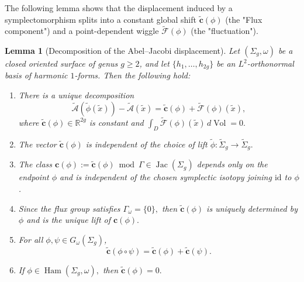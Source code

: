\documentclass[11pt]{article}
\newtheorem{lemma}[theorem]{Lemma}
\theoremstyle{definition}
\newcommand{\Ham}{\operatorname{Ham}}
\begin{document}
	
	
	
	The following lemma shows that the displacement induced by a symplectomorphism
	splits into a constant global shift $\widetilde{\mathbf c}(\phi)$ (the "Flux
	component") and a point-dependent wiggle $\widetilde{\mathcal F}(\phi)$ (the
	"fluctuation").
	
	\begin{lemma}[Decomposition of the Abel--Jacobi displacement]
		\label{lem:AJ_decomposition}
		Let $(\Sigma_g,\omega)$ be a closed oriented surface of genus $g\ge2$, and let
		$\{h_1,\ldots,h_{2g}\}$ be an $L^2$-orthonormal basis of harmonic $1$-forms.
		Then the following hold:
		
		\begin{enumerate}
			\item
			There is a unique decomposition
			\[
			\widetilde{\mathcal A}(\widetilde\phi(\tilde x))
			-
			\widetilde{\mathcal A}(\tilde x)
			=
			\widetilde{\mathbf c}(\phi)
			+
			\widetilde{\mathcal F}(\phi)(\tilde x),
			\]
			where $\widetilde{\mathbf c}(\phi)\in\mathbb R^{2g}$ is constant and $\int_D
			\widetilde{\mathcal F}(\phi)(\tilde x)\, d\operatorname{Vol} =0.$
			
			\item
			The vector $\widetilde{\mathbf c}(\phi)$ is independent of the choice of lift
			$\widetilde\phi:\widetilde\Sigma_g\to\widetilde\Sigma_g.$
			
			\item
			The class $\mathbf c(\phi) := \widetilde{\mathbf c}(\phi)\bmod\Gamma \in
			\operatorname{Jac}(\Sigma_g)$ depends only on the endpoint $\phi$ and is
			independent of the chosen symplectic isotopy joining $\mathrm{id}$ to
			$\phi$.	
			
			\item
			Since the flux group satisfies $\Gamma_\omega=\{0\},$ then $\widetilde{\mathbf
				c}(\phi)$ is uniquely determined by $\phi$ and is the unique lift of $\mathbf
			c(\phi).$
			
			\item 	For all $\phi,\psi\in G_\omega(\Sigma_g)$,
			\[
			\widetilde{\mathbf c}(\phi\circ\psi)
			=
			\widetilde{\mathbf c}(\phi)
			+
			\widetilde{\mathbf c}(\psi).
			\]
			
			\item
			If $\phi\in\Ham(\Sigma_g,\omega),$ then $\widetilde{\mathbf c}(\phi)=0.$
			
		\end{enumerate}
	\end{lemma}
	
\end{document}
